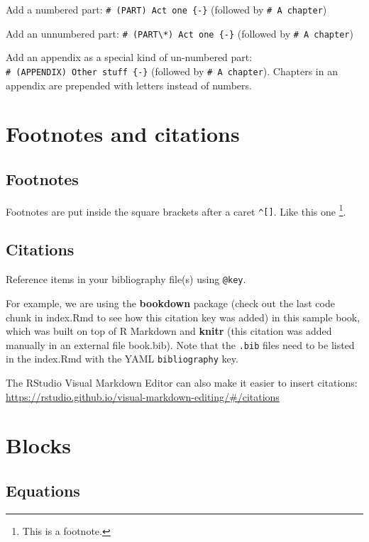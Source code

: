 \documentclass[
  20pt,
]{book}
\theoremstyle{definition}
\theoremstyle{definition}
\theoremstyle{definition}
\theoremstyle{definition}
\theoremstyle{remark}
\begin{document}
Add a numbered part: \texttt{\#\ (PART)\ Act\ one\ \{-\}} (followed by \texttt{\#\ A\ chapter})

Add an unnumbered part: \texttt{\#\ (PART\textbackslash{}*)\ Act\ one\ \{-\}} (followed by \texttt{\#\ A\ chapter})

Add an appendix as a special kind of un-numbered part: \texttt{\#\ (APPENDIX)\ Other\ stuff\ \{-\}} (followed by \texttt{\#\ A\ chapter}). Chapters in an appendix are prepended with letters instead of numbers.

\chapter{Footnotes and citations}\label{footnotes-and-citations}

\section{Footnotes}\label{footnotes}

Footnotes are put inside the square brackets after a caret \texttt{\^{}{[}{]}}. Like this one \footnote{This is a footnote.}.

\section{Citations}\label{citations}

Reference items in your bibliography file(s) using \texttt{@key}.

For example, we are using the \textbf{bookdown} package \citep{R-bookdown} (check out the last code chunk in index.Rmd to see how this citation key was added) in this sample book, which was built on top of R Markdown and \textbf{knitr} \citep{xie2015} (this citation was added manually in an external file book.bib).
Note that the \texttt{.bib} files need to be listed in the index.Rmd with the YAML \texttt{bibliography} key.

The RStudio Visual Markdown Editor can also make it easier to insert citations: \url{https://rstudio.github.io/visual-markdown-editing/\#/citations}

\chapter{Blocks}\label{blocks}

\section{Equations}\label{equations}
\end{document}
